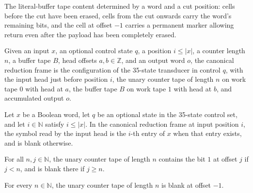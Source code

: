 \begin{definition}
\label{Complexity.satRedBuffer}
\leanok
{}
The literal-buffer tape content determined by a word and a cut position: cells
before the cut have been erased, cells from the cut onwards carry the word's
remaining bits, and the cell at offset $-1$ carries a permanent marker allowing
return even after the payload has been completely erased.
\end{definition}

\begin{definition}
\label{Complexity.satRedCfg}
\leanok
{}
Given an input $x$, an optional control state $q$, a position $i \le |x|$, a
counter length $n$, a buffer tape $B$, head offsets $a, b \in \mathbb{Z}$, and an
output word $o$, the canonical reduction frame is the configuration of the
35-state transducer in control $q$, with the input head just before position $i$,
the unary counter tape of length $n$ on work tape $0$ with head at $a$, the buffer
tape $B$ on work tape $1$ with head at $b$, and accumulated output $o$.
\end{definition}

\begin{lemma}
\label{Complexity.satRedCfg_input}
\leanok
{}
Let $x$ be a Boolean word, let $q$ be an optional state in the 35-state control set, and
let $i\in\mathbb{N}$ satisfy $i\le |x|$. In the canonical reduction frame at input
position $i$, the symbol read by the input head is the $i$-th entry of $x$ when that
entry exists, and is blank otherwise.
\end{lemma}

\begin{lemma}
\label{Complexity.satRedCounter_read}
\leanok
{}
For all $n,j\in\mathbb{N}$, the unary counter tape of length $n$ contains the bit $1$ at
offset $j$ if $j<n$, and is blank there if $j\ge n$.
\end{lemma}

\begin{lemma}
\label{Complexity.satRedCounter_left}
\leanok
{}
For every $n\in\mathbb{N}$, the unary counter tape of length $n$ is blank at offset
$-1$.
\end{lemma}

